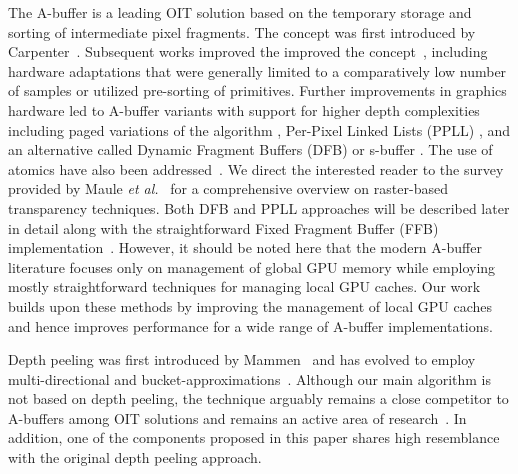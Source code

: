 \documentclass{egpubl}
\def\etal{\emph{et al.}}
\newcommand{\ab}{\mbox{A-buffer}}
\begin{document}
The \ab{} is a leading OIT solution based on the temporary storage and sorting of intermediate pixel fragments. 
The concept was first introduced by Carpenter~\cite{Carpenter1984}. 
Subsequent works improved the improved the concept~\cite{ebert1990abuffer,callahan2005kbuffer,bavoil2007multifragkbuffer,myers2007techrep,Vasilakis2014}, including hardware adaptations that were generally limited to a comparatively low number of samples or utilized pre-sorting of primitives. 
Further improvements in graphics hardware led to \ab{} variants with support for higher depth complexities including paged variations of the algorithm \cite{kainz2009ray,Crassin2010}, Per-Pixel Linked Lists (PPLL) \cite{Yang2010}, and an alternative called Dynamic Fragment Buffers (DFB) or s-buffer \cite{Maule2012,Vasilakis2012}. 
The use of atomics have also been addressed~\cite{Kerzner2013}. 
We direct the interested reader to the survey provided by Maule \etal~\cite{Maule2011} for a comprehensive overview on raster-based transparency techniques.
%
Both DFB and PPLL approaches will be described later in detail along with the straightforward Fixed Fragment Buffer (FFB) implementation~\cite{Crassin2010}. 
However, it should be noted here that the modern \ab{} literature focuses only on management of global GPU memory while employing mostly straightforward techniques for managing local GPU caches. 
Our work builds upon these methods by improving the management of local GPU caches and hence improves performance for a wide range of \ab{} implementations.

Depth peeling was first introduced by Mammen~\cite{Mammen1989} and has evolved to employ multi-directional and bucket-approximations~\cite{Everitt2001,wexler2005hiddensurface,carr2008depthpeel,Bavoil2008,Liu2009}. 
Although our main algorithm is not based on depth peeling, the technique arguably remains a close competitor to \ab{}s among OIT solutions and remains an active area of research~\cite{Vasilakis2013,Yu2013}. 
In addition, one of the components proposed in this paper shares high resemblance with the original depth peeling approach. 

\end{document}
